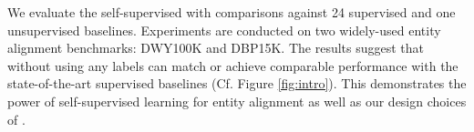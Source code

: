 {We evaluate the self-supervised \solution  with comparisons against 24 supervised and one unsupervised baselines. 
Experiments are conducted on two widely-used entity alignment benchmarks: DWY100K and DBP15K. 
The results suggest that \solution without using any labels can match or achieve comparable performance with the state-of-the-art supervised baselines (Cf.  Figure \ref{fig:intro}). 
This demonstrates the power of self-supervised learning for entity alignment as well as our design choices of \solution. 





}%
